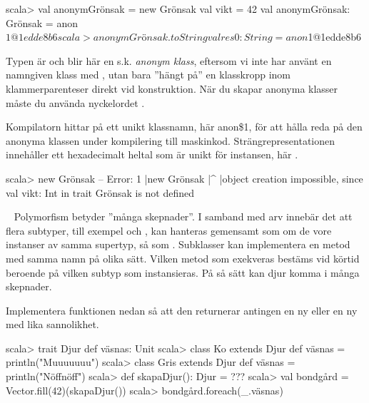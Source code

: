 \SubtaskSolved  
\begin{REPLnonum}
scala> val anonymGrönsak = new Grönsak { val vikt = 42 }
val anonymGrönsak: Grönsak = anon$1@1edde8b6
scala> anonymGrönsak.toString                                                                                      
val res0: String = anon$1@1edde8b6
\end{REPLnonum}
Typen är  och blir här en s.k. \emph{anonym klass}, eftersom vi inte har använt en namngiven klass med , utan bara ''hängt på'' en klasskropp inom klammerparenteser direkt vid konstruktion. När du skapar anonyma klasser måste du använda nyckelordet .

Kompilatorn hittar på ett unikt klassnamn, här anon\$1, för att hålla reda på den anonyma klassen under kompilering till maskinkod. Strängrepresentationen innehåller ett hexadecimalt heltal som är unikt för instansen, här .

\SubtaskSolved  

\begin{REPLsmall}
scala> new Grönsak { }
-- Error:
1 |new Grönsak { }
  |^
  |object creation impossible, since val vikt: Int in trait Grönsak is not defined 

\end{REPLsmall}


\QUESTEND







\QUESTBEGIN

\Task  \what~  Polymorfism betyder ''många skepnader''. I samband med arv  innebär det att flera subtyper, till exempel  och , kan hanteras gemensamt som om de vore instanser av samma supertyp, så som . Subklasser kan implementera en metod med samma namn på olika sätt. Vilken metod som exekveras bestäms vid körtid beroende på vilken subtyp som instansieras. På så sätt kan djur komma i många skepnader.

\Subtask Implementera funktionen  nedan så att den returnerar antingen en ny  eller en ny  med lika sannolikhet.

\begin{REPL}
scala> trait Djur { def väsnas: Unit }
scala> class Ko   extends Djur { def väsnas = println("Muuuuuuu") }
scala> class Gris extends Djur { def väsnas = println("Nöffnöff") }
scala> def skapaDjur(): Djur = ???
scala> val bondgård = Vector.fill(42)(skapaDjur())
scala> bondgård.foreach(_.väsnas)
\end{REPL}

